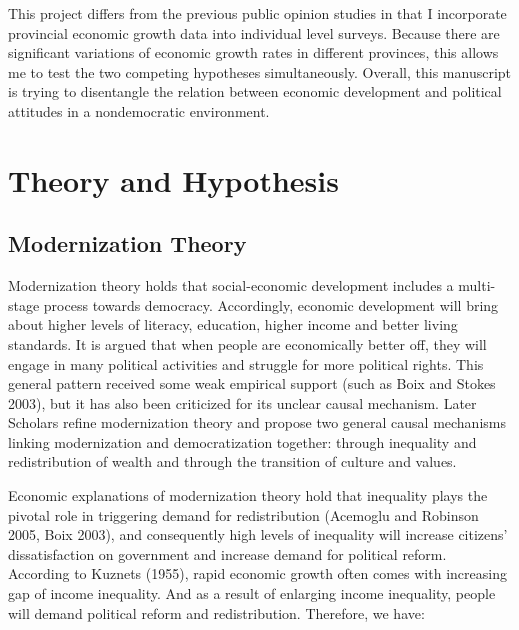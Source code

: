 \documentclass[12pt]{article}\usepackage[]{graphicx}\usepackage[]{color}
\begin{document}
This project differs from the previous public opinion studies in that I incorporate provincial economic growth data into individual level surveys. Because there are significant variations of economic growth rates in different provinces, this allows me to test the two competing hypotheses simultaneously. Overall, this manuscript is trying to disentangle the relation between economic development and political attitudes in a nondemocratic environment. 


 




 
\nocite{HolbigGilley2010,YangChen2013,ChenDickson2008,Zhai2015,Lipset1993,Lipset1959,Lewis-Beck2000,Pan2015,Wallace2016}
\nocite{WorldBank1,WorldBank2,Kennedy2010,Lewis-Becketal2014,Truex2014,Li2008,Przeworski1997,Tsai2010,Meng2014,King2013,Huta2014}
\nocite{Rabe-Heskethetal2005,Rabe-Heskethetal2004,Pei2012,Mackinnon2011,Lorentzen2014,Huntington2008,Wintrobe1998,Boix2003a}

\section{Theory and Hypothesis}
\subsection{Modernization Theory}
Modernization theory holds that social-economic development includes a multi-stage process towards democracy. Accordingly, economic development will bring about higher levels of literacy, education, higher income and better living standards. It is argued that when people are economically better off, they will engage in many political activities and struggle for more political rights. This general pattern received some weak empirical support (such as Boix and Stokes 2003), but it has also been criticized for its unclear causal mechanism. Later Scholars refine modernization theory and propose two general causal mechanisms linking modernization and democratization together: through inequality and redistribution of wealth and through the transition of culture and values.


Economic explanations of modernization theory hold that inequality plays the pivotal role in triggering demand for redistribution (Acemoglu and Robinson 2005, Boix 2003), and consequently high levels of inequality will increase citizens' dissatisfaction on government and increase demand for political reform. According to Kuznets (1955), rapid economic growth
often comes with increasing gap of income inequality. And as a result of enlarging income inequality, people will demand political reform and redistribution. Therefore, we have:
\end{document}
